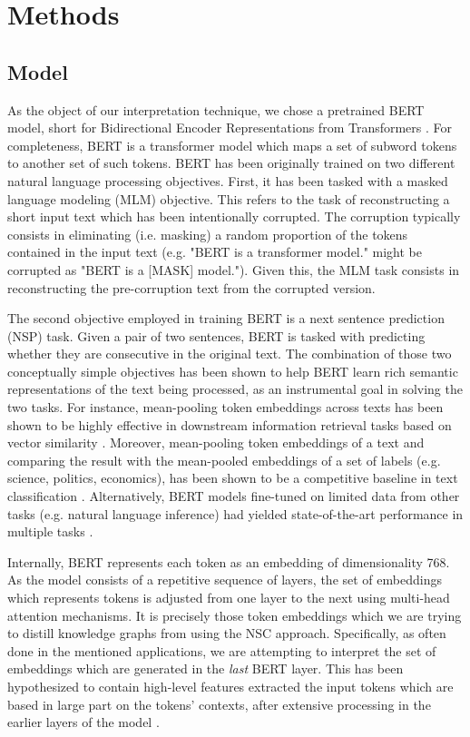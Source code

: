 \section{Methods}\label{sec:methods}

\subsection{Model}

As the object of our interpretation technique, we chose a pretrained BERT model, short for Bidirectional Encoder Representations from Transformers \citep{devlin_bert_nodate}. For completeness, BERT is a transformer model which maps a set of subword tokens to another set of such tokens. BERT has been originally trained on two different natural language processing objectives. First, it has been tasked with a masked language modeling (MLM) objective. This refers to the task of reconstructing a short input text which has been intentionally corrupted. The corruption typically consists in eliminating (i.e. masking) a random proportion of the tokens contained in the input text (e.g. "BERT is a transformer model." might be corrupted as "BERT is a [MASK] model."). Given this, the MLM task consists in reconstructing the pre-corruption text from the corrupted version.

The second objective employed in training BERT is a next sentence prediction (NSP) task. Given a pair of two sentences, BERT is tasked with predicting whether they are consecutive in the original text. The combination of those two conceptually simple objectives has been shown to help BERT learn rich semantic representations of the text being processed, as an instrumental goal in solving the two tasks. For instance, mean-pooling token embeddings across texts has been shown to be highly effective in downstream information retrieval tasks based on vector similarity \citep{reimers_sentence-bert_2019}. Moreover, mean-pooling token embeddings of a text and comparing the result with the mean-pooled embeddings of a set of labels (e.g. science, politics, economics), has been shown to be a competitive baseline in text classification \citep{yin_benchmarking_2019}. Alternatively, BERT models fine-tuned on limited data from other tasks (e.g. natural language inference) had yielded state-of-the-art performance in multiple tasks \citep{jiang_evaluating_2019}.

Internally, BERT represents each token as an embedding of dimensionality 768. As the model consists of a repetitive sequence of layers, the set of embeddings which represents tokens is adjusted from one layer to the next using multi-head attention mechanisms. It is precisely those token embeddings which we are trying to distill knowledge graphs from using the NSC approach. Specifically, as often done in the mentioned applications, we are attempting to interpret the set of embeddings which are generated in the \textit{last} BERT layer. This has been hypothesized to contain high-level features extracted the input tokens which are based in large part on the tokens' contexts, after extensive processing in the earlier layers of the model \citep{tenney_bert_2019}.

